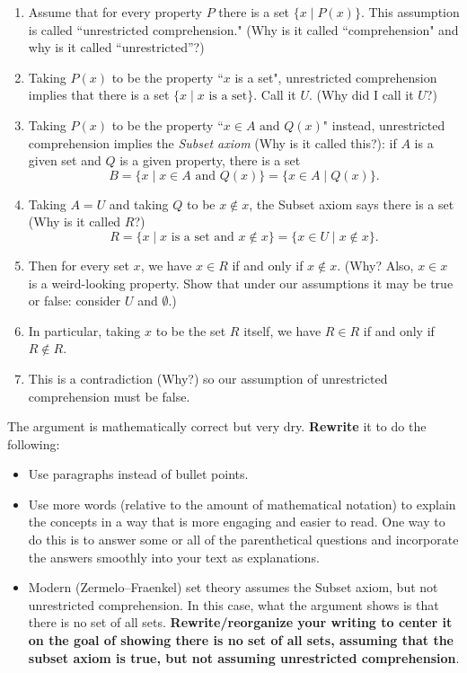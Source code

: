 \documentclass{article}
\begin{document}
\begin{enumerate}
    \item Assume that for every property $P$ there is a set $\{x \mid P(x)\}$.  This assumption is called ``unrestricted comprehension." (Why is it called ``comprehension" and why is it called ``unrestricted''?)

    \item Taking $P(x)$ to be the property ``$x$ is a set", unrestricted comprehension implies that there is a set $\{x \mid x \text{ is a set}\}$.  Call it $U$.  (Why did I call it $U$?)

    \item Taking $P(x)$ to be the property ``$x \in A \text{ and } Q(x)$" instead, unrestricted comprehension implies the \emph{Subset axiom} (Why is it called this?): if $A$ is a given set and $Q$ is a given property, there is a set
    \[B = \{x \mid x \in A \text{ and }Q(x)\} = \{x \in A \mid Q(x)\}.\]
    
    \item Taking $A = U$ and taking $Q$ to be $x \notin x$, the Subset axiom says there is a set (Why is it called $R$?)
    \[R = \{x \mid x \text{ is a set and } x \notin x\} = \{x \in U \mid x \notin x\}.\]

    \item Then for every set $x$, we have $x \in R$ if and only if $x \notin x$. (Why? Also, $x \in x$ is a weird-looking property.  Show that under our assumptions it may be true or false: consider $U$ and $\emptyset$.)

    \item In particular, taking $x$ to be the set $R$ itself, we have $R \in R$ if and only if $R \notin R$.
    
    \item This is a contradiction (Why?) so our assumption of unrestricted comprehension must be false.
\end{enumerate}
The argument is mathematically correct but very dry.  \textbf{Rewrite} it to do the following:
\begin{itemize}
    \item Use paragraphs instead of bullet points.
    \item Use more words (relative to the amount of mathematical notation) to explain the concepts in a way that is more engaging and easier to read.  One way to do this is to answer some or all of the parenthetical questions and incorporate the answers smoothly into your text as explanations.
    \item Modern (Zermelo--Fraenkel) set theory assumes the Subset axiom, but not unrestricted comprehension.  In this case, what the argument shows is that there is no set of all sets.  \textbf{Rewrite/reorganize your writing to center it on the goal of showing there is no set of all sets, assuming that the subset axiom is true, but not assuming unrestricted comprehension}.
\end{itemize}
\end{document}
